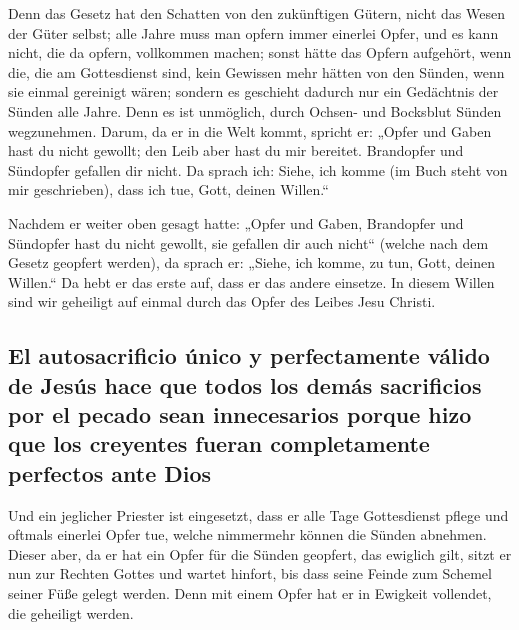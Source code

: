  Denn das Gesetz hat den Schatten von den zukünftigen
Gütern, nicht das Wesen der Güter selbst; alle Jahre muss man opfern
immer einerlei Opfer, und es kann nicht, die da opfern, vollkommen
machen;  sonst hätte das Opfern aufgehört, wenn die, die
am Gottesdienst sind, kein Gewissen mehr hätten von den Sünden, wenn sie
einmal gereinigt wären;  sondern es geschieht dadurch nur
ein Gedächtnis der Sünden alle Jahre.  Denn es ist
unmöglich, durch Ochsen- und Bocksblut Sünden wegzunehmen.
 Darum, da er in die Welt kommt, spricht er: „Opfer und
Gaben hast du nicht gewollt; den Leib aber hast du mir bereitet.
 Brandopfer und Sündopfer gefallen dir nicht.
 Da sprach ich: Siehe, ich komme (im Buch steht von mir
geschrieben), dass ich tue, Gott, deinen Willen.``

 Nachdem er weiter oben gesagt hatte: „Opfer und Gaben,
Brandopfer und Sündopfer hast du nicht gewollt, sie gefallen dir auch
nicht`` (welche nach dem Gesetz geopfert werden),  da
sprach er: „Siehe, ich komme, zu tun, Gott, deinen Willen.`` Da hebt er
das erste auf, dass er das andere einsetze.  In diesem
Willen sind wir geheiligt auf einmal durch das Opfer des Leibes Jesu
Christi.

\hypertarget{el-autosacrificio-uxfanico-y-perfectamente-vuxe1lido-de-jesuxfas-hace-que-todos-los-demuxe1s-sacrificios-por-el-pecado-sean-innecesarios-porque-hizo-que-los-creyentes-fueran-completamente-perfectos-ante-dios}{%
\subsection{El autosacrificio único y perfectamente válido de Jesús hace
que todos los demás sacrificios por el pecado sean innecesarios porque
hizo que los creyentes fueran completamente perfectos ante
Dios}\label{el-autosacrificio-uxfanico-y-perfectamente-vuxe1lido-de-jesuxfas-hace-que-todos-los-demuxe1s-sacrificios-por-el-pecado-sean-innecesarios-porque-hizo-que-los-creyentes-fueran-completamente-perfectos-ante-dios}}

 Und ein jeglicher Priester ist eingesetzt, dass er alle
Tage Gottesdienst pflege und oftmals einerlei Opfer tue, welche
nimmermehr können die Sünden abnehmen.  Dieser aber, da
er hat ein Opfer für die Sünden geopfert, das ewiglich gilt, sitzt er
nun zur Rechten Gottes  und wartet hinfort, bis dass
seine Feinde zum Schemel seiner Füße gelegt werden.  Denn
mit einem Opfer hat er in Ewigkeit vollendet, die geheiligt werden.

